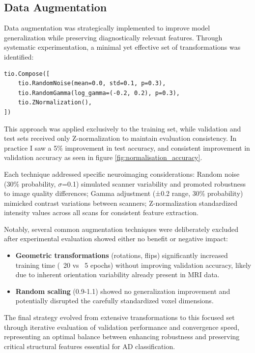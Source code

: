 \documentclass[12pt, a4paper]{article}
\begin{document}
\subsection{Data Augmentation}

Data augmentation was strategically implemented to improve model generalization while preserving diagnostically relevant features. Through systematic experimentation, a minimal yet effective set of transformations was identified:

\begin{verbatim}
tio.Compose([
    tio.RandomNoise(mean=0.0, std=0.1, p=0.3),
    tio.RandomGamma(log_gamma=(-0.2, 0.2), p=0.3),
    tio.ZNormalization(),
])
\end{verbatim}

This approach was applied exclusively to the training set, while validation and test sets received only Z-normalization to maintain evaluation consistency. In practice I saw a 5\% improvement in test accuracy, and consistent improvement in validation accuracy as seen in figure \ref{fig:normalisation_accuracy}.

Each technique addressed specific neuroimaging considerations: Random noise (30\% probability, $\sigma$=0.1) simulated scanner variability and promoted robustness to image quality differences; Gamma adjustment (±0.2 range, 30\% probability) mimicked contrast variations between scanners; Z-normalization standardized intensity values across all scans for consistent feature extraction.

Notably, several common augmentation techniques were deliberately excluded after experimental evaluation showed either no benefit or negative impact:

\begin{itemize}
    \item \textbf{Geometric transformations} (rotations, flips) significantly increased training time (~20 vs ~5 epochs) without improving validation accuracy, likely due to inherent orientation variability already present in MRI data.
    
    \item \textbf{Random scaling} (0.9-1.1) showed no generalization improvement and potentially disrupted the carefully standardized voxel dimensions.
\end{itemize}

The final strategy evolved from extensive transformations to this focused set through iterative evaluation of validation performance and convergence speed, representing an optimal balance between enhancing robustness and preserving critical structural features essential for AD classification.
\end{document}
